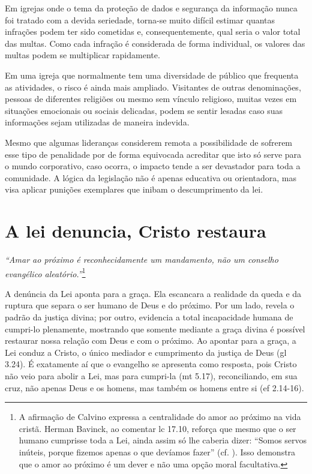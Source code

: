 Em igrejas onde o tema da proteção de dados e segurança da informação nunca foi tratado com a devida seriedade, torna-se muito difícil estimar quantas infrações podem ter sido cometidas e, consequentemente, qual seria o valor total das multas. Como cada infração é considerada de forma individual, os valores das multas podem se multiplicar rapidamente.

Em uma igreja que normalmente tem uma diversidade de público que frequenta as atividades, o risco é ainda mais ampliado. Visitantes de outras denominações, pessoas de diferentes religiões ou mesmo sem vínculo religioso, muitas vezes em situações emocionais ou sociais delicadas, podem se sentir lesadas caso suas informações sejam utilizadas de maneira indevida.

Mesmo que algumas lideranças considerem remota a possibilidade de sofrerem esse tipo de penalidade por de forma equivocada acreditar que isto só serve para o mundo corporativo, caso ocorra, o impacto tende a ser devastador para toda a comunidade. A lógica da legislação não é apenas educativa ou orientadora, mas visa aplicar punições exemplares que inibam o descumprimento da lei.

\section{A lei denuncia, Cristo restaura}

\textit{``Amar ao próximo é reconhecidamente um mandamento, não um conselho evangélico aleatório.''}\footnote{A afirmação de Calvino expressa a centralidade do amor ao próximo na vida cristã. Herman Bavinck, ao comentar \gls{lc} 17.10, reforça que mesmo que o ser humano cumprisse toda a Lei, ainda assim só lhe caberia dizer: ``Somos servos inúteis, porque fizemos apenas o que devíamos fazer'' (cf. \cite[p.~738]{bavinck2012}). Isso demonstra que o amor ao próximo é um dever e não uma opção moral facultativa.} \cite[p.~745]{calvino2022}

A denúncia da Lei aponta para a graça. Ela escancara a realidade da queda e da ruptura que separa o ser humano de Deus e do próximo. Por um lado, revela o padrão da justiça divina; por outro, evidencia a total incapacidade humana de cumpri-lo plenamente, mostrando que somente mediante a graça divina é possível restaurar nossa relação com Deus e com o próximo. Ao apontar para a graça, a Lei conduz a Cristo, o único mediador e cumprimento da justiça de Deus (\gls{gl} 3.24). É exatamente aí que o evangelho se apresenta como resposta, pois Cristo não veio para abolir a Lei, mas para cumpri-la (\gls{mt} 5.17), reconciliando, em sua cruz, não apenas Deus e os homens, mas também os homens entre si (\gls{ef} 2.14-16).

